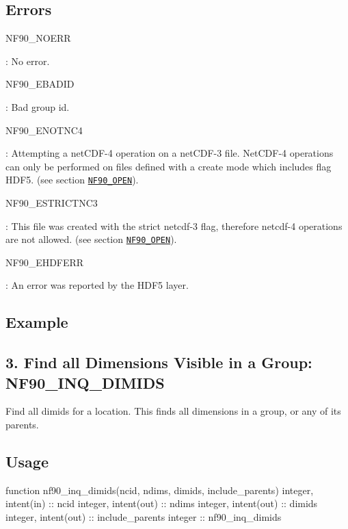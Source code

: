 \subsection*{Errors}

{\ttfamily N\+F90\+\_\+\+N\+O\+E\+RR}

\+: No error.

{\ttfamily N\+F90\+\_\+\+E\+B\+A\+D\+ID}

\+: Bad group id.

{\ttfamily N\+F90\+\_\+\+E\+N\+O\+T\+N\+C4}

\+: Attempting a net\+C\+D\+F-\/4 operation on a net\+C\+D\+F-\/3 file. Net\+C\+D\+F-\/4 operations can only be performed on files defined with a create mode which includes flag H\+D\+F5. (see section \href{#NF90_005fOPEN}{\tt N\+F90\+\_\+\+O\+P\+EN}).

{\ttfamily N\+F90\+\_\+\+E\+S\+T\+R\+I\+C\+T\+N\+C3}

\+: This file was created with the strict netcdf-\/3 flag, therefore netcdf-\/4 operations are not allowed. (see section \href{#NF90_005fOPEN}{\tt N\+F90\+\_\+\+O\+P\+EN}).

{\ttfamily N\+F90\+\_\+\+E\+H\+D\+F\+E\+RR}

\+: An error was reported by the H\+D\+F5 layer.

\subsection*{Example}\hypertarget{f90_groups_f90-find-all-dimensions-visible-in-a-group-nf90_inq_dimids}{}\subsection{3. Find all Dimensions Visible in a Group\+: N\+F90\+\_\+\+I\+N\+Q\+\_\+\+D\+I\+M\+I\+D\+S }\label{f90_groups_f90-find-all-dimensions-visible-in-a-group-nf90_inq_dimids}
Find all dimids for a location. This finds all dimensions in a group, or any of its parents.

\subsection*{Usage}


\begin{DoxyCode}
\textcolor{keyword}{function }nf90\_inq\_dimids(ncid, ndims, dimids, include\_parents)
  \textcolor{keywordtype}{integer}, \textcolor{keywordtype}{intent(in)} :: ncid
  \textcolor{keywordtype}{integer}, \textcolor{keywordtype}{intent(out)} :: ndims
  \textcolor{keywordtype}{integer}, \textcolor{keywordtype}{intent(out)} :: dimids
  \textcolor{keywordtype}{integer}, \textcolor{keywordtype}{intent(out)} :: include\_parents
  \textcolor{keywordtype}{integer} :: nf90\_inq\_dimids
\end{DoxyCode}


